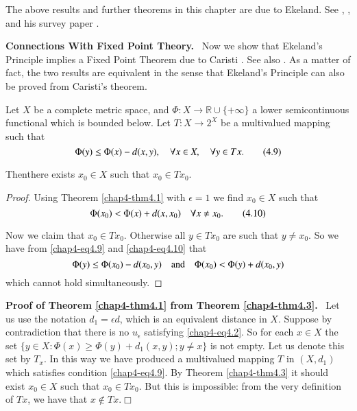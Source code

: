 \begin{remark*}
The above results and further theorems in this chapter are due to
Ekeland. See \cite{key37}, \cite{key38}, and his survey paper
\cite{key39}.
\end{remark*}

\noindent
{\bf Connections With Fixed Point Theory.}~ Now we show that Ekeland's
Principle implies a Fixed Point Theorem due to Caristi
\cite{key22}. See also \cite{key23}. As a matter of fact, the two
results are equivalent in the sense that Ekeland's Principle can also
be proved from Caristi's theorem.

\begin{theorem}\label{chap4-thm4.3}
Let $X$ be a complete metric space, and $\Phi:X\to \mathbb{R}\cup
\{+\infty\}$ a lower semicontinuous functional which is bounded
below. Let $T:X\to 2^{X}$ be a multivalued mapping such that
\begin{equation*}
\Phi(y)\leq \Phi(x)-d(x,y),\quad \forall x\in X,\quad \forall y\in
Tx.\tag{4.9}\label{chap4-eq4.9} 
\end{equation*}

Then\pageoriginale there exists $x_{0}\in X$ such that $x_{0}\in Tx_{0}$.
\end{theorem}

\begin{proof}
Using Theorem \ref{chap4-thm4.1} with $\epsilon=1$ we find $x_{0}\in
X$ such that
\begin{equation*}
\Phi(x_{0})<\Phi(x)+d(x,x_{0})\quad \forall x\neq
x_{0}.\tag{4.10}\label{chap4-eq4.10} 
\end{equation*}

Now we claim that $x_{0}\in Tx_{0}$. Otherwise all $y\in Tx_{0}$ are
such that $y\neq x_{0}$. So we have from \eqref{chap4-eq4.9} and
\eqref{chap4-eq4.10} that
$$
\Phi(y)\leq \Phi(x_{0})-d(x_{0},y)\quad\text{and}\quad \Phi(x_{0})<\Phi(y)+d(x_{0},y)
$$
which cannot hold simultaneously.
\end{proof}

\noindent
{\bf Proof of Theorem \ref{chap4-thm4.1} from Theorem
  \ref{chap4-thm4.3}.}~ Let us use the notation $d_{1}=\epsilon d$,
which is an equivalent distance in $X$. Suppose by contradiction that
there is no $u_{\epsilon}$ satisfying \eqref{chap4-eq4.2}. So for each
$x\in X$ the set $\{y\in X:\Phi(x)\geq \Phi(y)+d_{1}(x,y);y\neq x\}$
is not empty. Let us denote this set by $T_{x}$. In this way we have
produced a multivalued mapping $T$ in $(X,d_{1})$ which satisfies
condition \eqref{chap4-eq4.9}. By Theorem \ref{chap4-thm4.3} it should
exist $x_{0}\in X$ such that $x_{0}\in Tx_{0}$. But this is
impossible: from the very definition of $Tx$, we have that $x\not\in
Tx$.\hfill$\Box$

